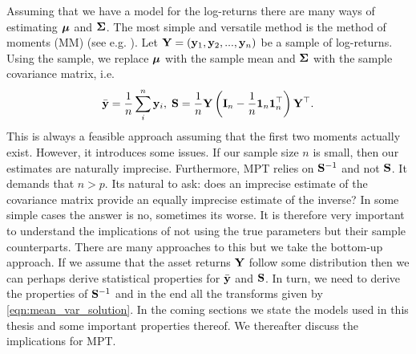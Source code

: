 \documentclass[oneside]{book}\usepackage{knitr}
\begin{document}
Assuming that we have a model for the log-returns there are many ways of estimating $\mbox{\boldmath$\mu$}$ and $\mathbf{\Sigma}$.
The most simple and versatile method is the method of moments (MM) (see e.g. \citet[ch. 9]{wasserman2004all}). 
Let $\mathbf{Y} = (\mathbf{y}_1, \mathbf{y}_2, ..., \mathbf{y}_n)$ be a sample of log-returns.
Using the sample, we replace $\mbox{\boldmath$\mu$}$ with the sample mean and $\mathbf{\Sigma}$ with the sample covariance matrix, i.e.
$$
\bar{\mathbf{y}} = \frac{1}{n} \sum_i^n \mathbf{y}_i, \; \mathbf{S} = \frac{1}{n}\mathbf{Y} \left(\mathbf{I}_n - \frac{1}{n} \mathbf{1}_n \mathbf{1}_n^\top \right) \mathbf{Y}^\top.
$$
This is always a feasible approach assuming that the first two moments actually exist. 
However, it introduces some issues.
If our sample size $n$ is small, then our estimates are naturally imprecise. 
Furthermore, MPT relies on $\mathbf{S}^{-1}$ and not $\mathbf{S}$.
It demands that $n>p$. 
Its natural to ask: does an imprecise estimate of the covariance matrix provide an equally imprecise estimate of the inverse?
In some simple cases the answer is no, sometimes its worse. 
It is therefore very important to understand the implications of not using the true parameters but their sample counterparts.
There are many approaches to this but we take the bottom-up approach. 
If we assume that the asset returns $\mathbf{Y}$ follow some distribution then we can perhaps derive statistical properties for $\bar{\mathbf{y}}$ and $\mathbf{S}$.
In turn, we need to derive the properties of $\mathbf{S}^{-1}$ and in the end all the transforms given by \eqref{eqn:mean_var_solution}.
In the coming sections we state the models used in this thesis and some important properties thereof.
We thereafter discuss the implications for MPT.
\end{document}
